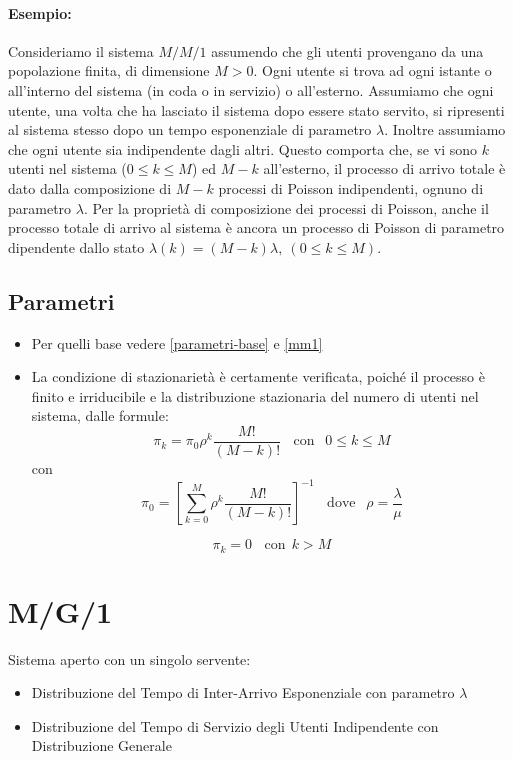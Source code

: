 \paragraph{Esempio:}
Consideriamo il sistema $M/M/1$ assumendo che gli utenti provengano da una
popolazione finita, di dimensione $M>0$. Ogni utente si trova ad ogni istante o
all'interno del sistema (in coda o in servizio) o all'esterno. Assumiamo che
ogni utente, una volta che ha lasciato il sistema dopo essere stato servito, si
ripresenti al sistema stesso dopo un tempo esponenziale di parametro $\lambda$. Inoltre
assumiamo che ogni utente sia indipendente dagli altri. Questo comporta che, se
vi sono $k$ utenti nel sistema ($0 \leq k \leq M$) ed $M-k$ all'esterno, il processo di
arrivo totale è dato dalla composizione di $M-k$ processi di Poisson indipendenti,
ognuno di parametro $\lambda$. Per la proprietà di composizione dei processi di Poisson,
anche il processo totale di arrivo al sistema è ancora un processo di Poisson di
parametro dipendente dallo stato $\lambda(k) = (M-k) \lambda, \  (0 \leq k \leq M)$.

\subsection{Parametri}

\begin{itemize}
    \item Per quelli base vedere \ref{parametri-base} e \ref{mm1}
    \item La condizione di stazionarietà è certamente verificata, poiché il processo è finito e irriducibile e la distribuzione
          stazionaria del numero di utenti nel sistema, dalle formule:
          $$\pi_k = \pi_0 \rho^k \frac{M!}{(M-k)!} \ \ \ \ \text{con } \  \ 0 \leq k \leq M$$
          con
          $$\pi_0 = \left [ \sum_{k=0}^{M} \rho^k \frac{M!}{(M-k)!} \right ]^{-1} \ \ \ \ \text{dove } \ \ \rho = \frac{\lambda}{\mu}$$

          $$\pi_k = 0 \ \ \ \ \text{con} \ \ k > M$$
\end{itemize}


\section{M/G/1} \label{mg1}

Sistema aperto con un singolo servente:

\begin{itemize}
    \item Distribuzione del Tempo di Inter-Arrivo Esponenziale con parametro
          $\lambda$
    \item Distribuzione del Tempo di Servizio degli Utenti Indipendente con
          Distribuzione Generale
\end{itemize}

